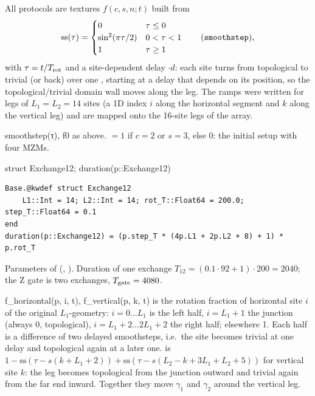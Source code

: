All protocols are textures $f(c,s,n;t)$ built from
\[
\mathrm{ss}(\tau) = \begin{cases}0 & \tau\le0\\ \sin^2(\pi\tau/2) & 0<\tau<1\\ 1 & \tau\ge1\end{cases}
\qquad(\texttt{smoothstep}),
\]
with $\tau = t/T_{\rm rot}$ and a site-dependent delay $\cdot d$: each site turns from topological to trivial (or back) over one
, starting at a delay that depends on its position, so the topological/trivial domain wall moves along the leg. The
ramps were written for legs of $L_1 = L_2 = 14$ sites (a 1D index $i$ along the horizontal segment and $k$ along the vertical leg) and are
mapped onto the 16-site legs of the array.

\begin{function}{smoothstep(τ), f0}
 as above.  $=1$ if $c=2$ or $s=3$, else $0$: the initial setup with four MZMs.
\end{function}

\begin{function}{struct Exchange12; duration(p::Exchange12)}
\begin{Verbatim}
Base.@kwdef struct Exchange12
    L1::Int = 14; L2::Int = 14; rot_T::Float64 = 200.0; step_T::Float64 = 0.1
end
duration(p::Exchange12) = (p.step_T * (4p.L1 + 2p.L2 + 8) + 1) * p.rot_T
\end{Verbatim}
Parameters of  (, ). Duration of one exchange
$T_{12} = (0.1\cdot92 + 1)\cdot200 = 2040$; the Z gate is two exchanges, $T_{\rm gate} = 4080$.
\end{function}

\begin{function}{f\_horizontal(p, i, t), f\_vertical(p, k, t)}
 is the rotation fraction of horizontal site $i$ of the original $L_1$-geometry: $i = 0\dots L_1$ is the left half,
$i = L_1+1$ the junction (always $0$, topological), $i = L_1+2\dots2L_1+2$ the right half; elsewhere 1. Each half is a difference of two
delayed smoothsteps, i.e.\ the site becomes trivial at one delay and topological again at a later one.  is
$1 - \mathrm{ss}(\tau - s(k+L_1+2)) + \mathrm{ss}(\tau - s(L_2 - k + 3L_1 + L_2 + 5))$ for vertical site $k$: the leg becomes topological
from the junction outward and trivial again from the far end inward. Together they move $\gamma_1$ and $\gamma_2$ around the vertical leg.
\end{function}

